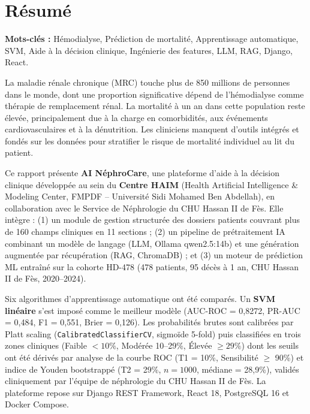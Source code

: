 \documentclass[12pt,a4paper,twoside]{report}
\begin{document}
\chapter*{Résumé}

\textbf{Mots-clés :} Hémodialyse, Prédiction de mortalité, Apprentissage automatique, SVM, Aide à la décision clinique, Ingénierie des features, LLM, RAG, Django, React.

\vspace{0.4cm}

La maladie rénale chronique (MRC) touche plus de 850 millions de personnes dans le monde, dont une proportion significative dépend de l'hémodialyse comme thérapie de remplacement rénal. La mortalité à un an dans cette population reste élevée, principalement due à la charge en comorbidités, aux événements cardiovasculaires et à la dénutrition. Les cliniciens manquent d'outils intégrés et fondés sur les données pour stratifier le risque de mortalité individuel au lit du patient.

Ce rapport présente \textbf{AI NéphroCare}, une plateforme d'aide à la décision clinique développée au sein du \textbf{Centre HAIM} (Health Artificial Intelligence \& Modeling Center, FMPDF -- Université Sidi Mohamed Ben Abdellah), en collaboration avec le Service de Néphrologie du CHU Hassan II de Fès. Elle intègre : (1) un module de gestion structurée des dossiers patients couvrant plus de 160 champs cliniques en 11 sections ; (2) un pipeline de prétraitement IA combinant un modèle de langage (LLM, Ollama qwen2.5:14b) et une génération augmentée par récupération (RAG, ChromaDB) ; et (3) un moteur de prédiction ML entraîné sur la cohorte HD-478 (478 patients, 95 décès à 1 an, CHU Hassan II de Fès, 2020--2024).

Six algorithmes d'apprentissage automatique ont été comparés. Un \textbf{SVM linéaire} s'est imposé comme le meilleur modèle (AUC-ROC = 0,8272, PR-AUC = 0,484, F1 = 0,551, Brier = 0,126). Les probabilités brutes sont calibrées par Platt scaling (\texttt{CalibratedClassifierCV}, sigmoïde 5-fold) puis classifiées en trois zones cliniques (Faible $<10\%$, Modérée 10--29\%, Élevée $\geq29\%$) dont les seuils ont été dérivés par analyse de la courbe ROC (T1 = 10\%, Sensibilité $\geq$ 90\%) et indice de Youden bootstrappé (T2 = 29\%, $n=1000$, médiane = 28,9\%), validés cliniquement par l'équipe de néphrologie du CHU Hassan II de Fès. La plateforme repose sur Django REST Framework, React 18, PostgreSQL 16 et Docker Compose.
\end{document}
